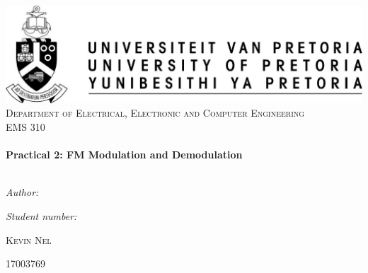 \begin{titlepage}

	\begin{center}
		\includegraphics[width=1\textwidth]{./up-logo.jpg}\\[0.4cm]
		\textsc{\LARGE Department of Electrical, Electronic and Computer Engineering}\\[1.5cm]
		\textsc{\Large EMS 310 }\\[0.5cm]
		\HRule \\[0.4cm]
		{ \huge \bfseries Practical 2: FM Modulation and Demodulation}\\[0.4cm]
		\HRule \\[0.4cm]


		\begin{minipage}{0.4\textwidth}
			\begin{flushleft} \large
				\emph{Author:}\\
			\end{flushleft}
		\end{minipage}
		\begin{minipage}{0.4\textwidth}
			\begin{flushright} \large
				\emph{Student number:} \\

			\end{flushright}
		\end{minipage}


		\begin{minipage}{0.4\textwidth}
			\begin{flushleft} \large
				\textsc{Kevin Nel}\\ %
			\end{flushleft}
		\end{minipage}
		\begin{minipage}{0.4\textwidth}
			\begin{flushright} \large
				17003769 %
			\end{flushright}
		\end{minipage}





\end{center}
\end{titlepage}
